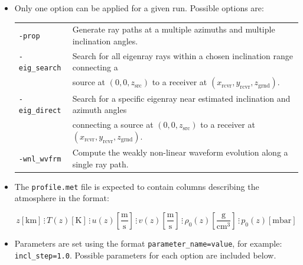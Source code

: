 \documentclass[10pt]{article}
\begin{document}
\begin{itemize}
 \item Only one option can be applied for a given run.  Possible options are:

\begin{tabular}{  l l }
  \verb=-prop=		& Generate ray paths at a multiple azimuths and multiple inclination angles. \\
  \verb=-eig_search=	& Search for all eigenray rays within a chosen inclination range connecting a \\
  				& \hspace{2pt} source at \( \left( 0, 0, z_\text{src} \right)\) to a receiver at \( \left( x_\text{rcvr}, y_\text{rcvr}, z_\text{grnd} \right) \). \\
  \verb=-eig_direct=	& Search for a specific eigenray near estimated inclination and azimuth angles \\
    				& \hspace{2pt} connecting a source at \( \left( 0, 0, z_\text{src} \right)\) to a receiver at \( \left( x_\text{rcvr}, y_\text{rcvr}, z_\text{grnd} \right) \). \\
  \verb=-wnl_wvfrm=	& Compute the weakly non-linear waveform evolution along a single ray path.

 \end{tabular}
 
 \item The \verb=profile.met= file is expected to contain columns describing the atmosphere in the format:

\begin{equation*} 
 z \left[ \text{km} \right] \hspace{2pt} \vdots \hspace{2pt}
 T(z) \left[ \text{K} \right] \hspace{2pt} \vdots \hspace{2pt}
 u(z) \left[ \frac{\text{m}}{\text{s}} \right] \hspace{2pt} \vdots \hspace{2pt}
 v(z) \left[ \frac{\text{m}}{\text{s}} \right] \hspace{2pt} \vdots \hspace{2pt}
 \rho_0(z) \left[ \frac{\text{g}}{\text{cm}^3} \right] \hspace{2pt} \vdots \hspace{2pt}
 p_0(z) \left[ \text{mbar} \right] 
\end{equation*}

 \item Parameters are set using the format \verb#parameter_name=value#, for example: \verb#incl_step=1.0#.  Possible parameters for each option are included below.
 \end{itemize}
\end{document}
